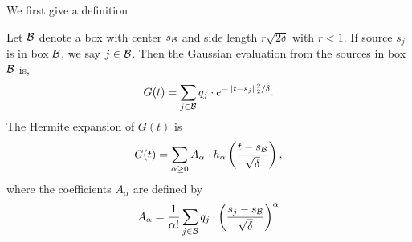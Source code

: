We first give a definition
\begin{definition}\label{def:G_t}
Let ${\cal B}$ denote a box with center $s_{\cal B}$ and side length $r \sqrt{2\delta}$ with $r < 1$.
If source $s_j$ is in box ${\cal B}$, we say $j \in {\cal B}$. Then the Gaussian evaluation from the sources in box ${\cal B}$ is,
\begin{align*}
G(t) = \sum_{j \in {\cal B}} q_j \cdot e^{ - \| t - s_j \|_2^2 /\delta  }.  
\end{align*}
The Hermite expansion of $G(t)$ is 
\begin{align}\label{eq:hermite_expansion_of_G_t}
G(t) = \sum_{\alpha \geq 0} A_{\alpha} \cdot h_{\alpha} \left( \frac{ t - s_{\cal B} }{ \sqrt{\delta} } \right),  
\end{align}
where the coefficients $A_{\alpha}$ are defined by
\begin{align}\label{eq:def_A_alpha}
A_{\alpha} = \frac{1}{\alpha !} \sum_{j \in {\cal B}} q_j \cdot \left( \frac{ s_j - s_{\cal B} }{ \sqrt{\delta} } \right)^{\alpha} 
\end{align}
\end{definition}

